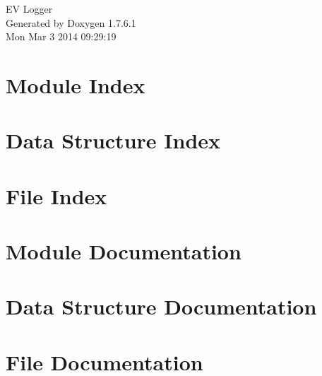 \documentclass[a4paper]{book}
\begin{document}
\hypersetup{pageanchor=false,citecolor=blue}
\begin{titlepage}
\vspace*{7cm}
\begin{center}
{\Large \-E\-V \-Logger }\\
\vspace*{1cm}
{\large \-Generated by Doxygen 1.7.6.1}\\
\vspace*{0.5cm}
{\small Mon Mar 3 2014 09:29:19}\\
\end{center}
\end{titlepage}
\clearemptydoublepage
{}
\tableofcontents
\clearemptydoublepage
{}
\hypersetup{pageanchor=true,citecolor=blue}
\chapter{\-Module \-Index}

\chapter{\-Data \-Structure \-Index}

\chapter{\-File \-Index}

\chapter{\-Module \-Documentation}


\chapter{\-Data \-Structure \-Documentation}


\chapter{\-File \-Documentation}



















\printindex
\end{document}
